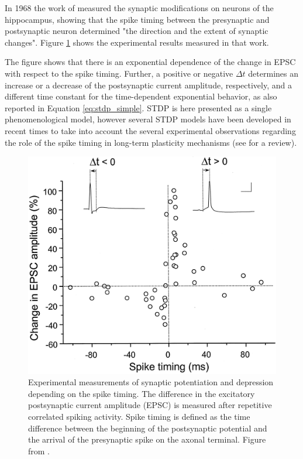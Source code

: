 \documentclass[a4paper, 12pt, twoside, openright]{book}
\begin{document}
In 1968 the work of \cite{Bi1998} measured the synaptic modifications on neurons of the hippocampus, showing that the spike timing between the presynaptic and postsynaptic neuron determined "the direction and the extent of synaptic changes". Figure \ref{fig:stdp_bi_poo} shows the experimental results measured in that work.


The figure shows that there is an exponential dependence of the change in EPSC with respect to the spike timing. Further, a positive or negative $\Delta t$ determines an increase or a decrease of the postsynaptic current amplitude, respectively, and a different time constant for the time-dependent exponential behavior, as also reported in Equation \eqref{eq:stdp_simple}. STDP is here presented as a single phenomenological model, however several STDP models have been developed in recent times to take into account the several experimental observations regarding the role of the spike timing in long-term plasticity mechanisms (see \cite{Morrison2008} for a review).


\begin{figure}[H]
    \centering
    \includegraphics[width=0.6\columnwidth]{figures/stdp_bi_poo.jpg}
    \caption{Experimental measurements of synaptic potentiation and depression depending on the spike timing. The difference in the excitatory postsynaptic current amplitude (EPSC) is measured after repetitive correlated spiking activity. Spike timing is defined as the time difference between the beginning of the postsynaptic potential and the arrival of the presynaptic spike on the axonal terminal. Figure from \cite{Bi1998}.}
    \label{fig:stdp_bi_poo}
\end{figure}
\end{document}
